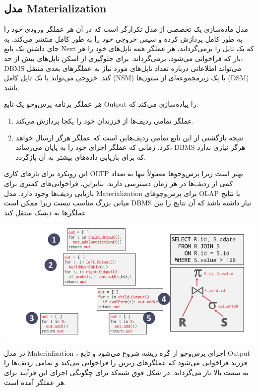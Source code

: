 \pagebreak
\subsection{مدل Materialization‌}

مدل ماده‌سازی یک تخصصی از مدل تکرارگر است که در آن هر عملگر ورودی خود را به طور کامل پردازش کرده و سپس خروجی خود را به طور کامل منتشر می‌کند. به جای داشتن یک تابع Next که یک تاپل را برمی‌گرداند، هر عملگر همه تاپل‌های خود را هر بار که فراخوانی می‌شود، برمی‌گرداند. برای جلوگیری از اسکن تاپل‌های بیش از حد، DBMS می‌تواند اطلاعاتی درباره تعداد تاپل‌های مورد نیاز به عملگرهای بعدی منتقل کند. خروجی می‌تواند یا یک تاپل کامل (NSM) یا یک زیرمجموعه‌ای از ستون‌ها (DSM) باشد.

هر عملگر برنامه پرس‌وجو یک تابع Output را پیاده‌سازی می‌کند که:
\begin{enumerate}
	\item عملگر تمامی ردیف‌ها از فرزندان خود را یکجا پردازش می‌کند.
	
	\item نتیجه بازگشتی از این تابع تمامی ردیف‌هایی است که عملگر هرگز ارسال خواهد کرد. زمانی که عملگر اجرای خود را به پایان می‌رساند، DBMS هرگز نیازی ندارد که برای بازیابی داده‌های بیشتر به آن بازگردد.
\end{enumerate}

این رویکرد برای بارهای کاری OLTP بهتر است زیرا پرس‌وجوها معمولاً تنها به تعداد کمی از ردیف‌ها در هر زمان دسترسی دارند. بنابراین، فراخوانی‌های کمتری برای بازیابی ردیف‌ها وجود دارد. مدل Materialization برای پرس‌وجوهای OLAP با نتایج میانی بزرگ مناسب نیست زیرا ممکن است DBMS نیاز داشته باشد که آن نتایج را بین عملگرها به دیسک منتقل کند.

\qquad\qquad\qquad	\includegraphics[width=0.7\linewidth]{screenshot002}

در مدل Materialization ، اجرای پرس‌وجو از گره ریشه شروع می‌شود و تابع Output فرزند فراخوانی می‌شود که عملگرهای زیرین را فراخوانی می‌کند و تمامی ردیف‌ها را به سمت بالا باز می‌گرداند. در شکل فوق شبه‌کد برای چگونگی اجرای این فرآیند برای هر عملگر آمده است.

\pagebreak

